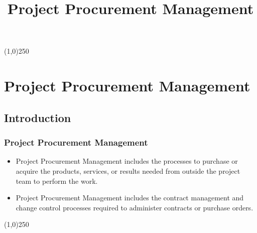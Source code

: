 



\title[Project Management \& BIM]{Project Procurement Management}




%
\usetikzlibrary{arrows}

\tableofcontents
\newpage



\begin{frame}
\titlepage
\end{frame}\begin{center}\line(1,0){250}\end{center}
%
%








\section{Project Procurement Management}

\subsection{Introduction}


\begin{frame}
\frametitle{Project Procurement Management}
\begin{itemize}
	\item Project Procurement Management includes the processes to purchase or acquire the products, services, or results needed from outside the project team to perform the work.
	\item Project Procurement Management includes the contract management and change control processes required to administer contracts or purchase orders.
\end{itemize}
\end{frame}\begin{center}\line(1,0){250}\end{center}



